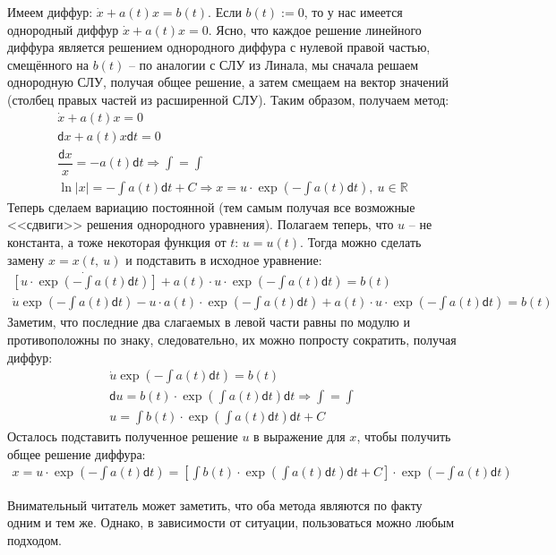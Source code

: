 \documentclass[a4paper,12pt]{article}
\newcommand{\R}{\mathbb{R}}
\renewcommand{\d}{\mathsf{d}}
\newcommand{\du}{\dot{u}}
\newcommand{\dx}{\dot{x}}
\newcommand{\ds}{\displaystyle}
\begin{document}
Имеем диффур: $\dx + a(t)x = b(t)$. Если $b(t) := 0$, то у нас имеется однородный диффур $\dx + a(t)x = 0$. Ясно, что каждое решение линейного диффура является решением однородного диффура с нулевой правой частью, смещённого на $b(t)$ -- по аналогии с СЛУ из Линала, мы сначала решаем однородную СЛУ, получая общее решение, а затем смещаем на вектор значений (столбец правых частей из расширенной СЛУ). Таким образом, получаем метод:
\begin{gather*}
\dx + a(t)x = 0\\
\d x + a(t)x\d t = 0\\
\dfrac{\d x}{x} = -a(t)\d t \Longrightarrow \ds\int = \int \\
\ln|x| = -\ds\int a(t)\d t + C \Longrightarrow x = u \cdot \exp(-\ds\int a(t) \d t),\ u \in \R
\end{gather*}
Теперь сделаем вариацию постоянной (тем самым получая все возможные <<сдвиги>> решения однородного уравнения). Полагаем теперь, что $u$ -- не константа, а тоже некоторая функция от $t$: $u = u(t)$. 
Тогда можно сделать замену $x = x(t,\ u)$ и подставить в исходное уравнение:
\begin{gather*}
\dot{\left[u \cdot \exp(-\ds\int a(t)\d t)\right]} + a(t) \cdot u \cdot \exp(-\ds\int a(t) \d t) = b(t)\\
\du\exp(-\ds\int a(t) \d t) - u \cdot a(t) \cdot \exp(-\ds\int a(t)\d t) + a(t) \cdot u \cdot \exp(-\ds\int a(t)\d t) = b(t)
\end{gather*}
Заметим, что последние два слагаемых в левой части равны по модулю и противоположны по знаку, следовательно, их можно попросту сократить, получая диффур:
\begin{gather*}
\du\exp(-\ds\int a(t)\d t) = b(t)\\
\d u = b(t) \cdot \exp(\ds\int a(t) \d t) \d t \Longrightarrow \ds\int = \int\\
u = \ds\int b(t) \cdot \exp(\ds\int a(t) \d t) \d t + C
\end{gather*}
Осталось подставить полученное решение $u$ в выражение для $x$, чтобы получить общее решение диффура:
\begin{gather*}
x = u \cdot \exp(-\ds\int a(t)\d t) = \left[\ds\int b(t) \cdot \exp(\ds\int a(t) \d t)\d t + C\right] \cdot \exp(-\ds\int a(t) \d t)
\end{gather*}

Внимательный читатель может заметить, что оба метода являются по факту одним и тем же. Однако, в зависимости от ситуации, пользоваться можно любым подходом.
\ \\
\end{document}
